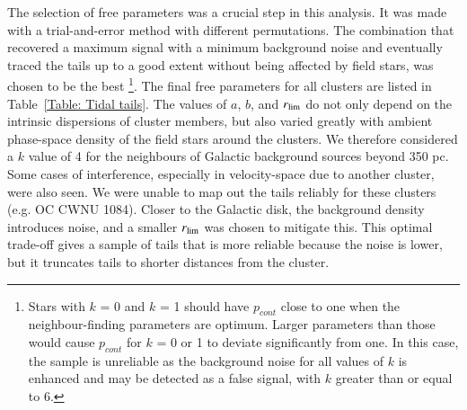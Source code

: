 \documentclass{aa}
\newcommand{\vik}[1]{{\color{red} #1}}
\begin{document}
The selection of free parameters was a crucial step in this analysis. It was made with a trial-and-error method with different permutations. 
The combination that recovered a maximum signal with a minimum background noise and eventually traced the tails up to a good extent without being affected by field stars, was chosen to be the best \footnote{Stars with $k$ = 0 and $k$ = 1 should have $p_{cont}$ close to one when the neighbour-finding parameters are optimum. Larger parameters than those would cause $p_{cont}$ for $k$ = 0 or 1 to deviate significantly from one. In this case, the sample is unreliable as the background noise for all values of $k$ is enhanced and may be detected as a false signal, with $k$ greater than or equal to 6.}.
The final free parameters for all clusters are listed in Table~\ref{Table: Tidal tails}. The values of $a$, $b$, and $r\textsubscript{lim}$ do not only depend on the intrinsic dispersions of cluster members, but also varied greatly with ambient phase-space density of the field stars around the clusters. We therefore considered a $k$ value of 4 for the neighbours of Galactic background sources beyond 350 pc. Some cases of interference, especially in velocity-space due to another cluster, were also seen. We were unable to map out the tails reliably for these clusters (e.g. OC CWNU 1084).
Closer to the Galactic disk, the background density introduces noise, and a smaller $r\textsubscript{lim}$ was chosen to mitigate this. This optimal trade-off gives a sample of tails that is more reliable because the noise is lower, but it truncates tails to shorter distances from the cluster.

\end{document}
